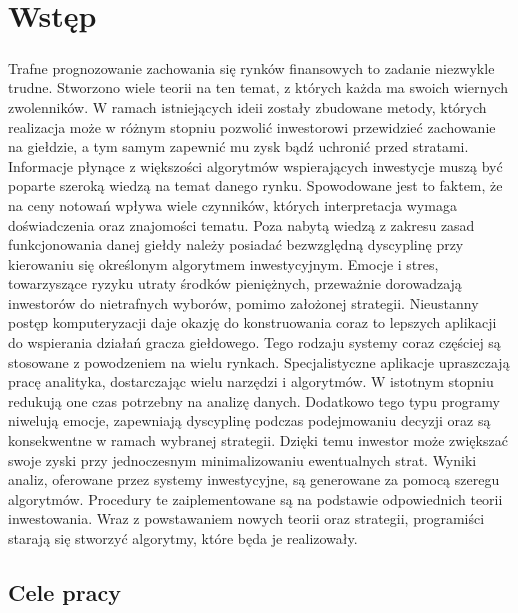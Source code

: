 \documentclass[pdflatex,11pt]{aghdpl}
\author{Tomasz Górny}
\date{2012}
\begin{document}
\titlepages

\tableofcontents
\clearpage

\chapter{Wstęp}
\label{chap:wstep}
\paragraph{}
Trafne prognozowanie zachowania się rynków finansowych to zadanie niezwykle trudne. Stworzono wiele teorii na ten temat, z których każda ma swoich wiernych zwolenników. W ramach istniejących ideii zostały zbudowane metody, których realizacja może w różnym stopniu pozwolić inwestorowi przewidzieć zachowanie na giełdzie, a tym samym zapewnić mu zysk bądź uchronić przed stratami. Informacje płynące z większości algorytmów wspierających inwestycje muszą być poparte szeroką wiedzą na temat danego rynku. Spowodowane jest to faktem, że na ceny notowań wpływa wiele czynników, których interpretacja wymaga doświadczenia oraz znajomości tematu. Poza nabytą wiedzą z zakresu zasad funkcjonowania danej giełdy należy posiadać bezwzględną dyscyplinę przy kierowaniu się określonym algorytmem inwestycyjnym. Emocje i stres, towarzyszące ryzyku utraty środków pieniężnych, przeważnie dorowadzają inwestorów do nietrafnych wyborów, pomimo założonej strategii. Nieustanny postęp komputeryzacji daje okazję do konstruowania coraz to lepszych aplikacji do wspierania działań gracza giełdowego. Tego rodzaju systemy coraz częściej są stosowane z powodzeniem na wielu rynkach. Specjalistyczne aplikacje upraszczają pracę analityka, dostarczając wielu narzędzi i algorytmów. W istotnym stopniu redukują one czas potrzebny na analizę danych. Dodatkowo tego typu programy niwelują emocje, zapewniają dyscyplinę podczas podejmowaniu decyzji oraz są konsekwentne w ramach wybranej strategii. Dzięki temu inwestor może zwiększać swoje zyski przy jednoczesnym minimalizowaniu ewentualnych strat. Wyniki analiz, oferowane przez systemy inwestycyjne, są generowane za pomocą szeregu algorytmów. Procedury te zaiplementowane są na podstawie odpowiednich teorii inwestowania. Wraz z powstawaniem nowych teorii oraz strategii, programiści starają się stworzyć algorytmy, które będa je realizowały.  
\section{Cele pracy}
\end{document}
